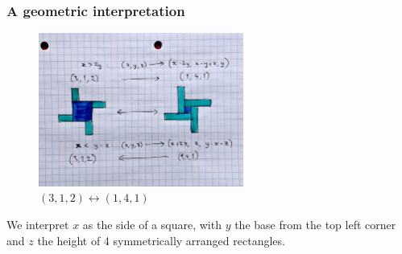 \documentclass{beamer}
\begin{document}
\begin{frame}
	\frametitle{A geometric interpretation}
	\begin{figure}
	\begin{center}
             \includegraphics[width=0.6\textwidth]{windmill_example_levels.jpg}
        \end{center}
		\caption*{ $(3,1,2) \leftrightarrow (1,4,1)$}
                \label{fig:windmill1}
	\end{figure}

	We interpret $x$ as the side of a square, with $y$ the base from the top left corner and
	$z$ the height of 4 symmetrically arranged rectangles.
\end{frame}
\end{document}

